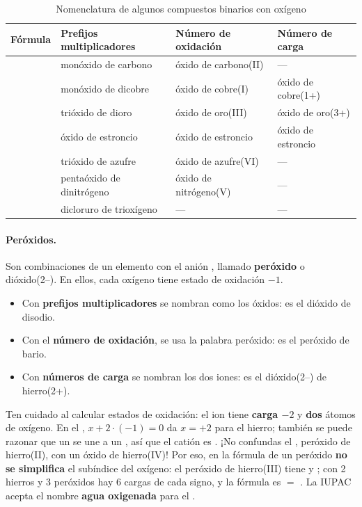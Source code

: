\begin{table}[H]
    \centering
    \caption{Nomenclatura de algunos compuestos binarios con oxígeno}
    \vspace{-5pt}
    \begin{tabular}{@{}lL{3.6cm}L{3.6cm}L{3.6cm}@{}}
        \toprule
        \textbf{Fórmula} & \textbf{Prefijos multiplicadores} & \textbf{Número de oxidación} & \textbf{Número de carga} \\
        \midrule
         & monóxido de carbono & óxido de carbono(II) & --- \\[3pt]
         & monóxido de dicobre & óxido de cobre(I) & óxido de cobre(1+) \\[3pt]
         & trióxido de dioro & óxido de oro(III) & óxido de oro(3+) \\[3pt]
         & óxido de estroncio & óxido de estroncio & óxido de estroncio \\[3pt]
         & trióxido de azufre & óxido de azufre(VI) & --- \\[3pt]
         & pentaóxido de dinitrógeno & óxido de nitrógeno(V) & --- \\[3pt]
         & dicloruro de trioxígeno & --- & --- \\
        \bottomrule
    \end{tabular}
    \label{tab:ud5-oxidos}
\end{table}

\paragraph{Peróxidos.} Son combinaciones de un elemento con el anión , llamado \textbf{peróxido} o dióxido(2\nobreakdash--). En
ellos, cada oxígeno tiene estado de oxidación \(-1\).
\begin{itemize}
    \item Con \textbf{prefijos multiplicadores} se nombran como los óxidos:  es el dióxido de disodio.
    \item Con el \textbf{número de oxidación}, se usa la palabra peróxido:  es el peróxido de bario.
    \item Con \textbf{números de carga} se nombran los dos iones:  es el dióxido(2\nobreakdash--) de hierro(2+).
\end{itemize}
Ten cuidado al calcular estados de oxidación: el ion  tiene \textbf{carga \(-2\)} y \textbf{dos} átomos de oxígeno.
En el , \(x + 2 \cdot (-1) = 0\) da \(x = +2\) para el hierro; también se puede razonar que un  se une a un
, así que el catión es . ¡No confundas el , peróxido de hierro(II), con un óxido de hierro(IV)!
Por eso, en la fórmula de un peróxido \textbf{no se simplifica} el subíndice del oxígeno: el peróxido de hierro(III) tiene
 y ; con 2 hierros y 3 peróxidos hay 6 cargas de cada signo, y la fórmula es  \(=\)
. La IUPAC acepta el nombre \textbf{agua oxigenada} para el .

